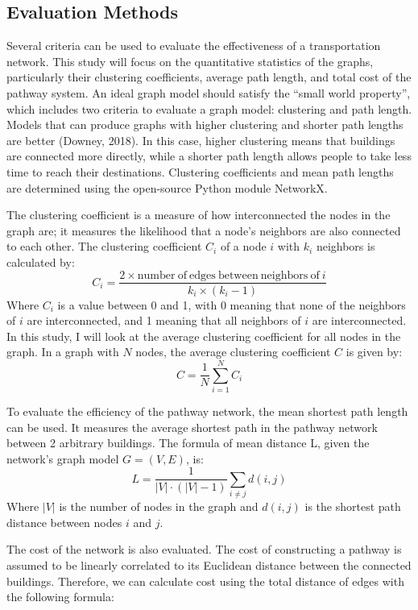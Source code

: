 \documentclass[11pt]{article}
\begin{document}
\subsection{Evaluation Methods}
Several criteria can be used to evaluate the effectiveness of a transportation network. This study will focus on the quantitative statistics of the graphs, particularly their clustering coefficients, average path length, and total cost of the pathway system. An ideal graph model should satisfy the “small world property”, which includes two criteria to evaluate a graph model: clustering and path length. Models that can produce graphs with higher clustering and shorter path lengths are better (Downey, 2018). In this case, higher clustering means that buildings are connected more directly, while a shorter path length allows people to take less time to reach their destinations. Clustering coefficients and mean path lengths are determined using the open-source Python module NetworkX. \par
	The clustering coefficient is a measure of how interconnected the nodes in the graph are; it measures the likelihood that a node's neighbors are also connected to each other. The clustering coefficient $C_i$ of a node $i$ with $k_i$ neighbors is calculated by:
\[C_i=\frac{2\times\mathrm{number\ of\ edges\ between\ neighbors\ of\ } i}{k_i\times\left(k_i-1\right)}\] 
Where $C_i$ is a value between 0 and 1, with 0 meaning that none of the neighbors of $i$ are interconnected, and 1 meaning that all neighbors of $i$ are interconnected. In this study, I will look at the average clustering coefficient for all nodes in the graph. In a graph with $N$ nodes, the average clustering coefficient $C$ is given by: 
\[C=\frac{1}{N}\sum_{i=1}^{N}C_i\] \par
 	To evaluate the efficiency of the pathway network, the mean shortest path length can be used. It measures the average shortest path in the pathway network between 2 arbitrary buildings. The formula of mean distance L, given the network’s graph model $G=\left(V,E\right)$, is:
\[L=\frac{1}{\left|V\right|\cdot\left(\left|V\right|-1\right)}\sum_{i\neq j} d\left(i,j\right)\] 
Where $\left|V\right|$ is the number of nodes in the graph and $d\left(i,j\right)$ is the shortest path distance between nodes $i$ and $j$. \par
The cost of the network is also evaluated. The cost of constructing a pathway is assumed to be linearly correlated to its Euclidean distance between the connected buildings. Therefore, we can calculate cost using the total distance of edges with the following formula:
\end{document}
